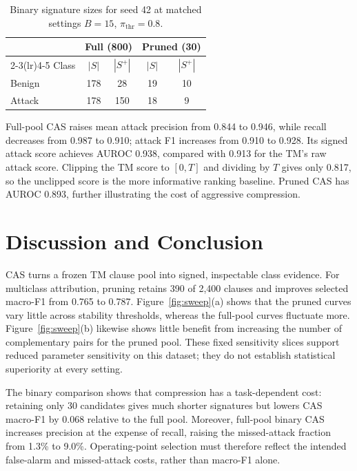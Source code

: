 \begin{table}[!htb]
\centering
\caption{Binary signature sizes for seed 42 at matched settings
$B=15$, $\pi_{\mathrm{thr}}=0.8$.}
\label{tab:binary-reduction}
\footnotesize
\begin{tabular}{@{}lcccc@{}}
\toprule
& \multicolumn{2}{c}{Full (800)} & \multicolumn{2}{c}{Pruned (30)} \\
\cmidrule(lr){2-3}\cmidrule(lr){4-5}
Class & $|S|$ & $|S^+|$ & $|S|$ & $|S^+|$ \\
\midrule
Benign & 178 & 28 & 19 & 10 \\
Attack & 178 & 150 & 18 & 9 \\
\bottomrule
\end{tabular}
\end{table}

Full-pool CAS raises mean attack precision from 0.844 to 0.946,
while recall decreases from 0.987 to 0.910; attack F1 increases from
0.910 to 0.928. Its signed attack score achieves AUROC 0.938,
compared with 0.913 for the TM's raw attack score. Clipping the TM
score to $[0,T]$ and dividing by $T$ gives only 0.817, so the
unclipped score is the more informative ranking baseline. Pruned CAS
has AUROC 0.893, further illustrating the cost of aggressive compression.

\section{Discussion and Conclusion}
CAS turns a frozen TM clause pool into signed, inspectable class
evidence. For multiclass attribution, pruning retains 390 of 2,400
clauses and improves selected macro-F1 from 0.765 to 0.787.
Figure~\ref{fig:sweep}(a) shows that the pruned curves vary little
across stability thresholds, whereas the full-pool curves fluctuate
more. Figure~\ref{fig:sweep}(b) likewise shows little benefit from
increasing the number of complementary pairs for the pruned pool.
These fixed sensitivity slices support reduced parameter sensitivity
on this dataset; they do not establish statistical superiority at
every setting.

The binary comparison shows that compression has a task-dependent
cost: retaining only 30 candidates gives much shorter signatures but
lowers CAS macro-F1 by 0.068 relative to the full pool. Moreover,
full-pool binary CAS increases precision at the expense of recall,
raising the missed-attack fraction from 1.3\% to 9.0\%. Operating-point
selection must therefore reflect the intended false-alarm and
missed-attack costs, rather than macro-F1 alone.

